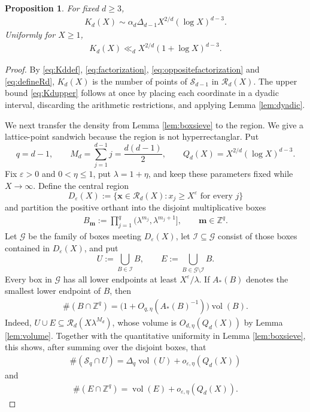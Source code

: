 \documentclass[12pt,a4paper,reqno]{amsart}
\numberwithin{equation}{section}
\newcommand{\cR}{\mathcal R}
\newcommand{\1}{\mathbf 1}
\newcommand{\eps}{\varepsilon}
\DeclareMathOperator{\vol}{vol}
\theoremstyle{plain}
\newtheorem{proposition}[theorem]{Proposition}
\theoremstyle{definition}
\begin{document}
\begin{proposition}\label{prop:Kd}
For fixed $d\geq3$,
\begin{align}
 K_d(X)\sim
 \alpha_d\Delta_{d-1}X^{2/d}(\log X)^{d-3}.
\label{eq:Kdasymp}
\end{align}
Uniformly for $X\geq1$,
\begin{align}
 K_d(X)\ll_dX^{2/d}(1+\log X)^{d-3}.
\label{eq:Kdupper}
\end{align}
\end{proposition}

\begin{proof}
By \eqref{eq:Kddef}, \eqref{eq:factorization},
\eqref{eq:oppositefactorization} and \eqref{eq:defineRd}, $K_d(X)$ is the number of points of
$\mathcal S_{d-1}$ in $\cR_d(X)$.  The upper bound
\eqref{eq:Kdupper} follows at once by placing each coordinate in a
dyadic interval, discarding the arithmetic restrictions, and applying
Lemma \ref{lem:dyadic}.

We next transfer the density from Lemma \ref{lem:boxsieve} to the
region.  We give a lattice-point sandwich because the region is not hyperrectanglar‌.  Put
\[
 q=d-1,\qquad
 M_d=\sum_{j=1}^{d-1}j=\frac{d(d-1)}2,\qquad
 Q_d(X)=X^{2/d}(\log X)^{d-3}.
\]
Fix $\eps>0$ and $0<\eta\leq1$, put $\lambda=1+\eta$, and keep these parameters
fixed while $X\to\infty$.  Define the central region
\[
 D_\eps(X):=\{\boldsymbol x\in\cR_d(X):
                    x_j\geq X^\eps\text{ for every }j\}
\]
and partition the positive orthant into the disjoint multiplicative
boxes
\begin{align*}
 B_{\boldsymbol m}:=
 \prod_{j=1}^{q}(\lambda^{m_j},\lambda^{m_j+1}],
 \qquad \boldsymbol m\in\mathbb Z^q.
\end{align*}
Let $\mathcal G$ be the family of boxes meeting $D_\eps(X)$, let
$\mathcal I\subseteq\mathcal G$ consist of those boxes contained in
$D_\eps(X)$, and put
\[
 U:=\bigcup_{B\in\mathcal I}B,
 \qquad E:=\bigcup_{B\in\mathcal G\setminus\mathcal I}B.
\]
Every box in $\mathcal G$ has all lower endpoints at least
$X^\eps/\lambda$.  If $A_*(B)$ denotes the smallest lower endpoint of
$B$, then
\begin{align*}
 \#(B\cap\mathbb Z^q)
 =\bigl(1+O_{q,\eta}(A_*(B)^{-1})\bigr)\vol(B).
\end{align*}
Indeed, $U\cup E\subseteq\cR_d(X\lambda^{M_d})$, whose volume is
$O_{d,\eta}(Q_d(X))$ by Lemma \ref{lem:volume}.
Together with the quantitative uniformity in Lemma
\ref{lem:boxsieve}, this shows, after summing over the disjoint boxes,
that
\begin{align}
 \#(\mathcal S_q\cap U)
 =\Delta_q\vol(U)+o_{\eps,\eta}(Q_d(X))
\label{eq:interiorboxdensity}
\end{align}
and
\begin{align}
 \#(E\cap\mathbb Z^q)
 =\vol(E)+o_{\eps,\eta}(Q_d(X)).
\label{eq:boundarylatticevolume}
\end{align}



\end{proof}
\end{document}
